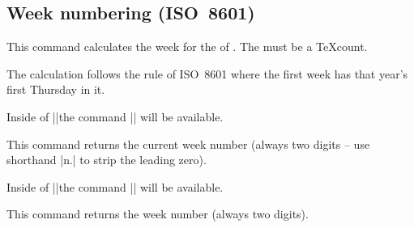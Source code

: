 \begin{multicols}{2}
\subsection{Week numbering (ISO~8601)}
\label{calendar:weeknumbering}
\begin{command}{\pgfcalendarjulianyeartoweek{}}
  This command calculates the week for the  of .
  The  must be a \TeX\space count.

  The calculation follows the rule of ISO~8601 where the first week has that
  year's first Thursday in it.
\end{command}

Inside of |\pgfcalendar|\indexCommandO\pgfcalendar the command |\pgfcalendarcurrentweek| will be available.
\begin{command}{\pgfcalendarcurrentweek}
  This command returns the current week number (always two digits -- use shorthand |n.|
  to strip the leading zero).
\end{command}

Inside of |\ifdate|\indexCommandO\ifdate the command |\pgfcalendarifdateweek| will be available.
\begin{command}{\pgfcalendarifdateweek}
  This command returns the week number (always two digits).
\end{command}
\end{multicols}